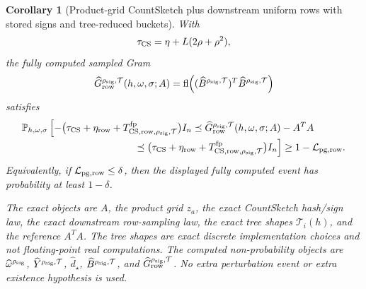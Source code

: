 \documentclass[11pt]{article}
\newcommand{\Prob}{\mathbb{P}}
\newcommand{\fl}{\operatorname{fl}}
\newcommand{\I}{I}
\newtheorem{corollary}[theorem]{Corollary}
\theoremstyle{remark}
\begin{document}
\begin{corollary}[Product-grid CountSketch plus downstream uniform rows with stored signs and tree-reduced buckets]
With
\[
  \tau_{\rm CS}=\eta+L(2\rho+\rho^2),
\]
the fully computed sampled Gram
\[
  \widehat G_{\rm row}^{\rho_{\rm sig},\mathcal T}(h,\omega,\sigma;A)
  =
  \fl\!\left(
    (\widehat B^{\rho_{\rm sig},\mathcal T})^T
    \widehat B^{\rho_{\rm sig},\mathcal T}
  \right)
\]
satisfies
\[
\begin{aligned}
&\Prob_{h,\omega,\sigma}
  \left[
    -\bigl(\tau_{\rm CS}+\eta_{\rm row}
      +T_{{\rm CS,row},\rho_{\rm sig},\mathcal T}^{\rm fp}\bigr)\I_n
    \preceq
    \widehat G_{\rm row}^{\rho_{\rm sig},\mathcal T}(h,\omega,\sigma;A)-A^TA
  \right.
\\[-2pt]
&\left.\hspace{4.0cm}
    \preceq
    \bigl(\tau_{\rm CS}+\eta_{\rm row}
      +T_{{\rm CS,row},\rho_{\rm sig},\mathcal T}^{\rm fp}\bigr)\I_n
  \right]
  \ge
  1-\mathcal L_{\rm pg,row}.
\end{aligned}
\]
Equivalently, if \(\mathcal L_{\rm pg,row}\le\delta\), then the displayed
fully computed event has probability at least \(1-\delta\).

The exact objects are \(A\), the product grid \(z_a\), the exact CountSketch
hash/sign law, the exact downstream row-sampling law, the exact tree shapes
\(\mathcal T_i(h)\), and the reference \(A^TA\).  The tree shapes are exact
discrete implementation choices and not floating-point real computations.  The
computed non-probability objects are \(\widehat\omega^{\rho_{\rm sig}}\),
\(\widehat Y^{\rho_{\rm sig},\mathcal T}\), \(\widehat d_\star\),
\(\widehat B^{\rho_{\rm sig},\mathcal T}\), and
\(\widehat G_{\rm row}^{\rho_{\rm sig},\mathcal T}\).  No extra
perturbation event or extra existence hypothesis is used.


\end{corollary}
\end{document}
